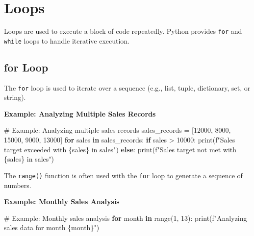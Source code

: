 \documentclass[
  letterpaper,
  DIV=11,
  numbers=noendperiod]{scrreprt}
\newenvironment{Shaded}{\begin{snugshade}}{\end{snugshade}}
\newcommand{\BuiltInTok}[1]{\textcolor[rgb]{0.00,0.23,0.31}{#1}}
\newcommand{\CommentTok}[1]{\textcolor[rgb]{0.37,0.37,0.37}{#1}}
\newcommand{\ControlFlowTok}[1]{\textcolor[rgb]{0.00,0.23,0.31}{\textbf{#1}}}
\newcommand{\DecValTok}[1]{\textcolor[rgb]{0.68,0.00,0.00}{#1}}
\newcommand{\KeywordTok}[1]{\textcolor[rgb]{0.00,0.23,0.31}{\textbf{#1}}}
\newcommand{\NormalTok}[1]{\textcolor[rgb]{0.00,0.23,0.31}{#1}}
\newcommand{\OperatorTok}[1]{\textcolor[rgb]{0.37,0.37,0.37}{#1}}
\newcommand{\SpecialCharTok}[1]{\textcolor[rgb]{0.37,0.37,0.37}{#1}}
\newcommand{\SpecialStringTok}[1]{\textcolor[rgb]{0.13,0.47,0.30}{#1}}
\begin{document}
\section{Loops}\label{loops-3}

Loops are used to execute a block of code repeatedly. Python provides
\texttt{for} and \texttt{while} loops to handle iterative execution.

\subsection{for Loop}\label{for-loop-2}

The \texttt{for} loop is used to iterate over a sequence (e.g., list,
tuple, dictionary, set, or string).

\textbf{Example: Analyzing Multiple Sales Records}

\begin{Shaded}
\begin{Highlighting}[]
\CommentTok{\# Example: Analyzing multiple sales records}
\NormalTok{sales\_records }\OperatorTok{=}\NormalTok{ [}\DecValTok{12000}\NormalTok{, }\DecValTok{8000}\NormalTok{, }\DecValTok{15000}\NormalTok{, }\DecValTok{9000}\NormalTok{, }\DecValTok{13000}\NormalTok{]}
\ControlFlowTok{for}\NormalTok{ sales }\KeywordTok{in}\NormalTok{ sales\_records:}
    \ControlFlowTok{if}\NormalTok{ sales }\OperatorTok{\textgreater{}} \DecValTok{10000}\NormalTok{:}
        \BuiltInTok{print}\NormalTok{(}\SpecialStringTok{f"Sales target exceeded with }\SpecialCharTok{\{}\NormalTok{sales}\SpecialCharTok{\}}\SpecialStringTok{ in sales"}\NormalTok{)}
    \ControlFlowTok{else}\NormalTok{:}
        \BuiltInTok{print}\NormalTok{(}\SpecialStringTok{f"Sales target not met with }\SpecialCharTok{\{}\NormalTok{sales}\SpecialCharTok{\}}\SpecialStringTok{ in sales"}\NormalTok{)}
\end{Highlighting}
\end{Shaded}

The \texttt{range()} function is often used with the \texttt{for} loop
to generate a sequence of numbers.

\textbf{Example: Monthly Sales Analysis}

\begin{Shaded}
\begin{Highlighting}[]
\CommentTok{\# Example: Monthly sales analysis}
\ControlFlowTok{for}\NormalTok{ month }\KeywordTok{in} \BuiltInTok{range}\NormalTok{(}\DecValTok{1}\NormalTok{, }\DecValTok{13}\NormalTok{):}
    \BuiltInTok{print}\NormalTok{(}\SpecialStringTok{f"Analyzing sales data for month }\SpecialCharTok{\{}\NormalTok{month}\SpecialCharTok{\}}\SpecialStringTok{"}\NormalTok{)}
\end{Highlighting}
\end{Shaded}
\end{document}
